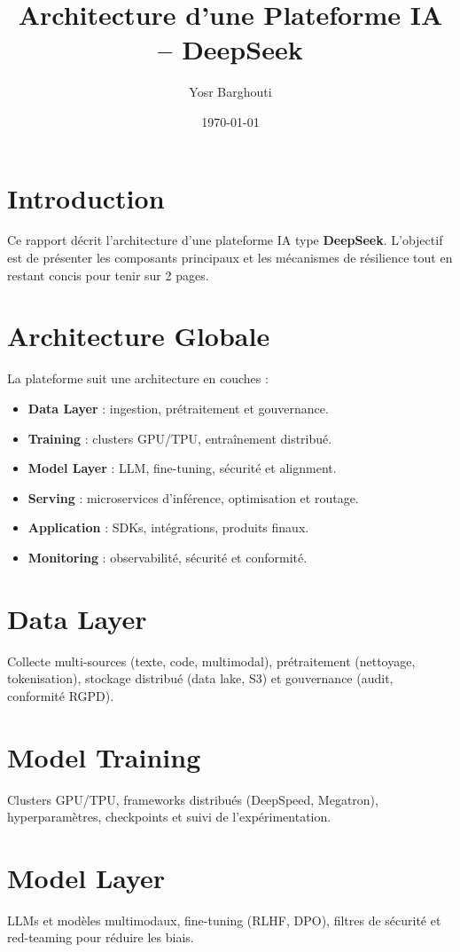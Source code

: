 \documentclass[12pt,a4paper]{article}
\title{Architecture d'une Plateforme IA -- DeepSeek}
\author{Yosr Barghouti}
\date{\today}
\begin{document}
\maketitle

\section*{Introduction}
Ce rapport décrit l’architecture d’une plateforme IA type \textbf{DeepSeek}. L’objectif est de présenter les composants principaux et les mécanismes de résilience tout en restant concis pour tenir sur 2 pages.

\section*{Architecture Globale}
La plateforme suit une architecture en couches :
\begin{itemize}
    \item \textbf{Data Layer} : ingestion, prétraitement et gouvernance.
    \item \textbf{Training} : clusters GPU/TPU, entraînement distribué.
    \item \textbf{Model Layer} : LLM, fine-tuning, sécurité et alignment.
    \item \textbf{Serving} : microservices d’inférence, optimisation et routage.
    \item \textbf{Application} : SDKs, intégrations, produits finaux.
    \item \textbf{Monitoring} : observabilité, sécurité et conformité.
\end{itemize}

\section*{Data Layer}
Collecte multi-sources (texte, code, multimodal), prétraitement (nettoyage, tokenisation), stockage distribué (data lake, S3) et gouvernance (audit, conformité RGPD).

\section*{Model Training}
Clusters GPU/TPU, frameworks distribués (DeepSpeed, Megatron), hyperparamètres, checkpoints et suivi de l’expérimentation.

\section*{Model Layer}
LLMs et modèles multimodaux, fine-tuning (RLHF, DPO), filtres de sécurité et red-teaming pour réduire les biais.
\end{document}

